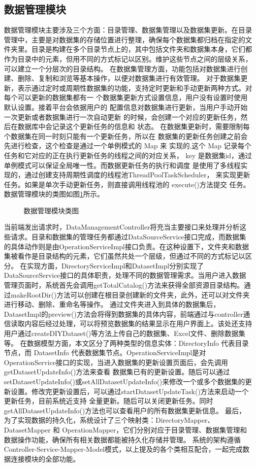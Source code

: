 \subsection{数据管理模块}
数据管理模块主要涉及三个方面：目录管理、数据集管理以及数据集更新。在目录管理中，主要是对数据集的存储位置进行整理，确保每个数据集都归档在指定的文件夹里。目录是构建在多个目录节点上的，其中包括文件夹和数据集本身，它们都作为目录中的元素，但用不同的方式标记以区别。维护这些节点之间的层级关系，可以建立一个分层次的目录结构。
在数据集管理方面，功能包括对数据集进行创建、删除、复制和浏览等基本操作，以便对数据集进行有效管理。
对于数据集更新，表示通过定时或周期性数据集的功能，支持定时更新和手动更新两种方式。对每个可以更新的数据集都有一
个数据集更新方式设置信息，用户没有设置时使用默认设置。接着平台会依据用户的
配置信息对数据集进行更新，当用户手动开始一次更新或者数据集进行一次自动更新
的时候，会创建一个对应的更新任务，然后在数据库中会记录这个更新任务的信息和
状态。
在数据集更新时，需要限制每个数据集在同一时刻只能有一个更新任务，所以在
数据集的更新任务创建之前会先进行检查，这个检查是通过一个单例模式的 Map 来
实现的,这个 Map 记录每个任务和它对应的正在执行更新任务的线程之间的对应关系，
key 是数据集id，通过单例模式可以保证全局唯一性。而数据更新任务的执行和调度
是使用了多线程实现的，通过创建支持周期性调度的线程池ThreadPoolTaskScheduler，
来实现更新任务。如果是单次手动更新任务，则直接调用线程池的 execute()方法提交
任务。
数据管理模块的类图如图\ref{fig:datamanageclass}所示。
\begin{figure}[H]
    \centering
    \caption{数据管理模块类图}
    \label{fig:datamanageclass}
\end{figure}
当前端发出请求时，DataManagementController将充当主要接口来处理并分析这些请求。目录和数据集的管理任务都通过DataSourceService接口完成，而数据集的具体动作则是由OperationServiceImpl接口负责。在这种设置下，文件夹和数据集被看作是目录结构的元素，它们虽然共处一个层级，但通过不同的方式标记以区分。
在实现方面，DirectoryServiceImpl和DatasetImpl分别实现了DataSourceService接口的具体职责，处理不同的数据管理需求。当用户进入数据管理页面时，系统首先会调用getTotalCatalog()方法来获得全部资源目录结构。通过makeRootDir()方法可以创建在根目录创建新的文件夹，此外，还可以对文件夹进行移动、删除、重命名等操作。
通过文件夹进入到具体的数据集后，DatasetImpl的preview()方法会将得到数据集的具体内容，前端通过与controller通信读取内容后经过处理，可以将预览数据集的结果显示在用户界面上。该处还支持用户通过createDIYDataset()等方法上传自己的数据集、Excel文件、删除数据集等。
在数据模型方面，本文区分了两种类型的信息实体：DirectoryInfo 代表目录节点，而 DatasetInfo 代表数据集节点。OperationServiceImpl是对OperationService接口的实现，当进入数据集的更新设置页面后，会先调用getDatasetUpdateInfo()方法来查看
数据集已有的更新设置。随后可以通过setDatasetUpdateInfo()或setAllDatasetUpdateInfo()来修改一个或多个数据集的更新设置。修改完更新设置后，可以通过startDatasetUpdateTask()方法来启动一个更新任务，目前系统近支持
全量更新。随后可以关闭更新任务。同时getAllDatasetUpdateInfo()方法也可以查看用户的所有数据集更新信息。
最后，为了实现数据的持久化，系统设计了三个映射类：DirectoryMapper、DatasetMapper 和 OperationMapper，它们分别对应于目录管理、数据集管理和数据操作功能，确保所有相关数据都能被持久化存储并管理。
系统的架构遵循Controller-Service-Mapper-Model模式，以上提及的各个类相互配合，一起完成数据连接模块的全部功能。
